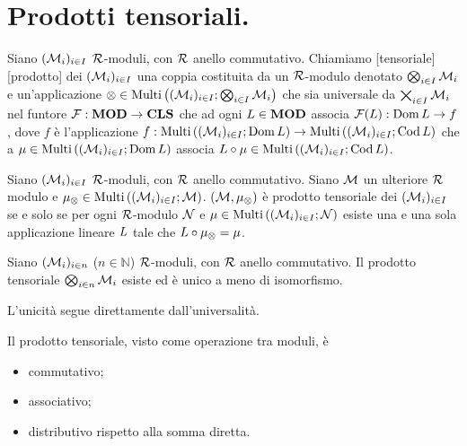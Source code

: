 \section{Prodotti tensoriali.}\label{ProdottiTensoriali}
\begin{Definition}
	Siano $(\mathcal{M}_i)_{i \in I}$ $\mathcal{R}$-moduli, con $\mathcal{R}$ anello commutativo. Chiamiamo [tensoriale][prodotto] dei $(\mathcal{M}_i)_{i \in I}$ una coppia costituita da un $\mathcal{R}$-modulo denotato $\bigotimes_{i \in I} \mathcal{M}_i$ e un'applicazione $\otimes \in \text{Multi}\left ( (\mathcal{M}_i)_{i \in I} ; \bigotimes_{i \in I} \mathcal{M}_i \right )$ che sia universale da $\bigtimes_{i \in I} \mathcal{M}_i$ nel funtore $\mathcal{F}: \mathbf{MOD} \rightarrow \mathbf{CLS}$ che ad ogni $L \in \mathbf{MOD}$ associa $\mathcal{F}(L): \operatorname{Dom}{L} \rightarrow f$, dove $f$ \`e l'applicazione $f: \text{Multi}\left ( (\mathcal{M}_i)_{i \in I} ; \operatorname{Dom}{L} \right ) \rightarrow \text{Multi}\left ( (\mathcal{M}_i)_{i \in I} ; \operatorname{Cod}{L} \right )$ che a $\mu \in \text{Multi}\left ( (\mathcal{M}_i)_{i \in I} ; \operatorname{Dom}{L} \right )$ associa $L \circ \mu \in \text{Multi}\left ( (\mathcal{M}_i)_{i \in I} ; \operatorname{Cod}{L} \right )$.
\end{Definition}
\begin{Theorem}%
	Siano $(\mathcal{M}_i)_{i \in  I}$ $\mathcal{R}$-moduli, con $\mathcal{R}$ anello commutativo. Siano $\mathcal{M}$ un ulteriore $\mathcal{R}$ modulo e $\mu_\otimes \in \text{Multi}\left ( (\mathcal{M}_i)_{i \in I} ; \mathcal{M} \right )$. $(\mathcal{M},\mu_\otimes)$ \`e prodotto tensoriale dei $(\mathcal{M}_i)_{i \in I}$ se e solo se per ogni $\mathcal{R}$-modulo $\mathcal{N}$ e $\mu \in \text{Multi}\left ( (\mathcal{M}_i)_{i \in I} ; \mathcal{N} \right )$ esiste una e una sola applicazione lineare $L$ tale che $L \circ \mu_\otimes = \mu$.
\end{Theorem}
\begin{Theorem}
	Siano $(\mathcal{M}_i)_{i \in n}$ ($n \in \mathbb{N}$) $\mathcal{R}$-moduli, con $\mathcal{R}$ anello commutativo. Il prodotto tensoriale $\bigotimes_{i \in n} \mathcal{M}_i$ esiste ed \`e unico a meno di isomorfismo.
\end{Theorem}
\Proof 
\par L'unicit\`a segue direttamente dall'universalit\`a.
\begin{Theorem}\label{th_tensor_product_properties}
	Il prodotto tensoriale, visto come operazione tra moduli, \`e
	\begin{itemize}
		\item commutativo;
		\item associativo;
		\item distributivo rispetto alla somma diretta.
	\end{itemize}
\end{Theorem}
